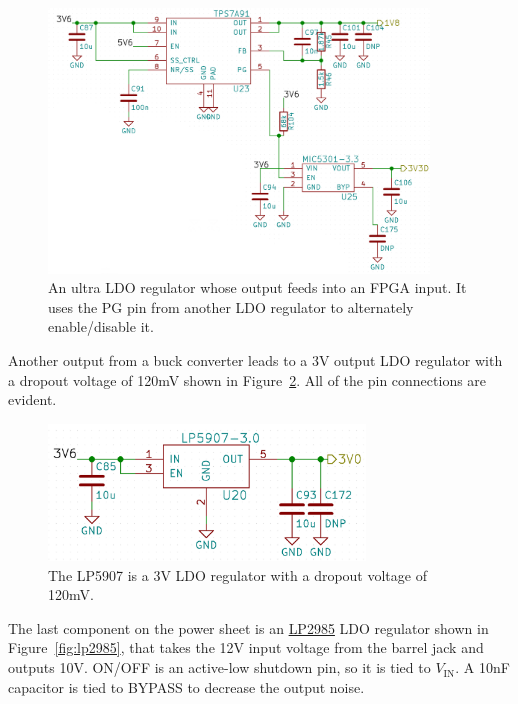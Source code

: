 \begin{figure}[h]
        \centering
        \includegraphics[width=0.9\textwidth]{data/ldo-ldo-connection.png}
        \caption{An ultra LDO regulator whose output feeds into an FPGA input. It uses the PG
          pin from another LDO regulator to alternately enable/disable it.}
        \label{fig:ldo-ldo-connection}
\end{figure}

Another output from a buck converter leads to a 3V output LDO regulator with a dropout voltage of
120mV shown in Figure~\ref{fig:lp5907}. All of the pin connections are evident.

\begin{figure}[h]
        \centering
        \includegraphics[width=0.75\textwidth]{data/lp5907.png}
        \caption{The LP5907 is a 3V LDO regulator with a dropout voltage of 120mV.}
        \label{fig:lp5907}
\end{figure}

The last component on the power sheet is an
\href{http://www.ti.com/lit/ds/symlink/lp2985.pdf}{LP2985} LDO regulator shown in
Figure~\ref{fig:lp2985}, that takes the 12V input voltage from the barrel jack and outputs
10V. ON/OFF is an active-low shutdown pin, so it is tied to $V_{\text{IN}}$. A 10nF capacitor is
tied to BYPASS to decrease the output noise.


